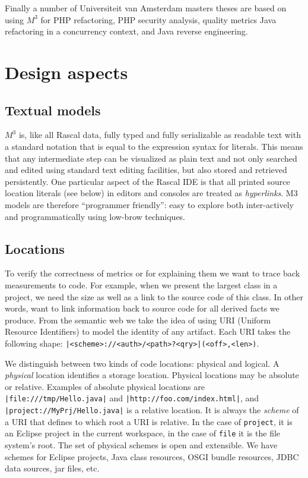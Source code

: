 \documentclass[conference]{IEEEtran}
\newcommand{\loc}[1]{\small{\texttt{#1}}\xspace}
\newcommand{\mthree}{\ensuremath{M^3}\xspace}
\begin{document}
Finally a number of Universiteit van Amsterdam masters theses are based on using \mthree for PHP refactoring, PHP security analysis, quality metrics
Java refactoring in a concurrency context, and Java reverse engineering.

\section{Design aspects}

\subsection{Textual models}

\mthree is, like all Rascal data, fully typed and fully serializable as readable
text with a standard notation that is equal to the expression syntax for
literals. This means that any intermediate step can be visualized as plain
text and not only searched and edited using standard text editing facilities,
but also stored and retrieved persistently. One particular aspect of the
Rascal IDE is that all printed source location literals (see below) in editors
and consoles are treated as \emph{hyperlinks}. M3 models are therefore
``programmer friendly'': easy to explore both inter-actively and
programmatically using low-brow techniques.

\subsection{Locations} 

To verify the correctness of metrics or for explaining them we want to trace
back measurements to code. For example, when we present the largest class in a
project, we need the size as well as a link to the source code of this class.
In other words, want to link information back to source code for all derived
facts we produce. From the semantic web we take the idea of using URI (Uniform
Resource Identifiers) to model the identity of any artifact. Each URI takes
the following shape: \loc{|<scheme>://<auth>/<path>?<qry>|(<off>,<len>)}.

We distinguish between two kinds of code locations: physical and logical. A
\emph{physical} location identifies a storage location. Physical locations may
be absolute or relative. Examples of absolute physical locations are
\loc{|file:///tmp/Hello.java|} and \loc{|http://foo.com/index.html|}, and
\loc{|project://MyPrj/Hello.java|} is a relative location. It is always the
\emph{scheme} of a URI that defines to which root a URI is relative. In the
case of \texttt{project}, it is an Eclipse project in the current workspace,
in the case of \texttt{file} it is the file system's root. The set of
physical schemes is open and extensible. We have schemes for Eclipse projects,
Java class resources, OSGI bundle resources, JDBC data sources, jar files,
etc.
\end{document}
